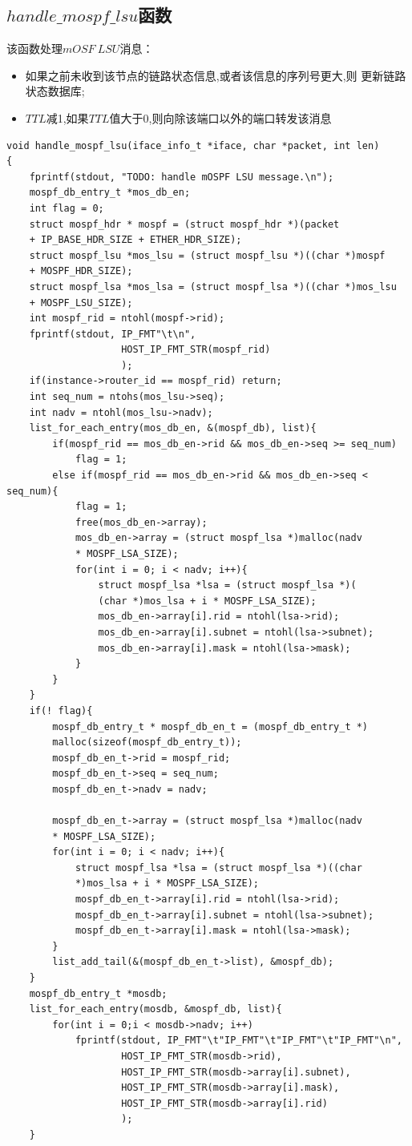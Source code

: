 \documentclass[UTF8,noindent]{ctexart}
\begin{document}
\subsection{$handle\_mospf\_lsu$函数}
该函数处理$mOSF\ LSU$消息：
\begin{itemize}
  \item 如果之前未收到该节点的链路状态信息,或者该信息的序列号更大,则
更新链路状态数据库;
\item $TTL$减1,如果$TTL$值大于$0$,则向除该端口以外的端口转发该消息
\end{itemize}
\begin{lstlisting}
void handle_mospf_lsu(iface_info_t *iface, char *packet, int len)
{
	fprintf(stdout, "TODO: handle mOSPF LSU message.\n");
    mospf_db_entry_t *mos_db_en;
    int flag = 0;
    struct mospf_hdr * mospf = (struct mospf_hdr *)(packet 
	+ IP_BASE_HDR_SIZE + ETHER_HDR_SIZE);
    struct mospf_lsu *mos_lsu = (struct mospf_lsu *)((char *)mospf 
	+ MOSPF_HDR_SIZE);
    struct mospf_lsa *mos_lsa = (struct mospf_lsa *)((char *)mos_lsu 
	+ MOSPF_LSU_SIZE);
    int mospf_rid = ntohl(mospf->rid);
    fprintf(stdout, IP_FMT"\t\n",
				    HOST_IP_FMT_STR(mospf_rid)
			        );
    if(instance->router_id == mospf_rid) return;
    int seq_num = ntohs(mos_lsu->seq);
    int nadv = ntohl(mos_lsu->nadv);
    list_for_each_entry(mos_db_en, &(mospf_db), list){
        if(mospf_rid == mos_db_en->rid && mos_db_en->seq >= seq_num)
        	flag = 1;
        else if(mospf_rid == mos_db_en->rid && mos_db_en->seq < seq_num){
        	flag = 1;
        	free(mos_db_en->array);
        	mos_db_en->array = (struct mospf_lsa *)malloc(nadv 
			* MOSPF_LSA_SIZE);
        	for(int i = 0; i < nadv; i++){
    		    struct mospf_lsa *lsa = (struct mospf_lsa *)(
				(char *)mos_lsa + i * MOSPF_LSA_SIZE);
    		    mos_db_en->array[i].rid = ntohl(lsa->rid);
    		    mos_db_en->array[i].subnet = ntohl(lsa->subnet);
    		    mos_db_en->array[i].mask = ntohl(lsa->mask);
    	    }
        }
    }
    if(! flag){
    	mospf_db_entry_t * mospf_db_en_t = (mospf_db_entry_t *)
		malloc(sizeof(mospf_db_entry_t));
    	mospf_db_en_t->rid = mospf_rid;
    	mospf_db_en_t->seq = seq_num;
    	mospf_db_en_t->nadv = nadv;
    
    	mospf_db_en_t->array = (struct mospf_lsa *)malloc(nadv 
		* MOSPF_LSA_SIZE);
    	for(int i = 0; i < nadv; i++){
    		struct mospf_lsa *lsa = (struct mospf_lsa *)((char 
			*)mos_lsa + i * MOSPF_LSA_SIZE);
    		mospf_db_en_t->array[i].rid = ntohl(lsa->rid);
    		mospf_db_en_t->array[i].subnet = ntohl(lsa->subnet);
    		mospf_db_en_t->array[i].mask = ntohl(lsa->mask);
    	}
    	list_add_tail(&(mospf_db_en_t->list), &mospf_db);
    }
    mospf_db_entry_t *mosdb;
    list_for_each_entry(mosdb, &mospf_db, list){
    	for(int i = 0;i < mosdb->nadv; i++)
    		fprintf(stdout, IP_FMT"\t"IP_FMT"\t"IP_FMT"\t"IP_FMT"\n",
    			    HOST_IP_FMT_STR(mosdb->rid),
				    HOST_IP_FMT_STR(mosdb->array[i].subnet), 
				    HOST_IP_FMT_STR(mosdb->array[i].mask),
				    HOST_IP_FMT_STR(mosdb->array[i].rid)
			        );
    }
    

\end{lstlisting}
\end{document}
